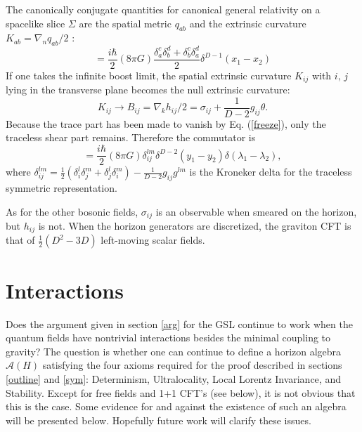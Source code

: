 \documentclass[12pt]{article}
\begin{document}
The canonically conjugate quantities for canonical general relativity on a spacelike slice $\Sigma$ are the spatial metric $q_{ab}$ and the extrinsic curvature
$K_{ab} = \nabla_{n} q_{ab}/2$ \cite{ADM}:
\begin{equation}
[q_{ab}(x_1),\,(K^{cd} - q^{cd} K)(x_2)] = \frac{i\hbar}{2} (8\pi G) \frac{\delta_a^c\delta_b^d + \delta_b^c\delta_a^d}{2} \delta^{D-1}(x_1 - x_2)
\end{equation}
If one takes the infinite boost limit, the spatial extrinsic curvature $K_{ij}$ with $i,\,j$ lying in the transverse plane becomes the null extrinsic curvature:
\begin{equation}
K_{ij} \to B_{ij} = \nabla_k h_{ij}/2 = \sigma_{ij} + \frac{1}{D-2} g_{ij} \theta.
\end{equation}
Because the trace part has been made to vanish by Eq. (\ref{freeze}), only the traceless shear part remains.  Therefore the commutator is
\begin{equation}
[h_{ij}(y_1,\,\lambda_1),\, \sigma^{lm}(y_2,\,\lambda_2)] = \frac{i\hbar}{2} (8 \pi G)
\delta_{ij}^{lm} \delta^{D-2}(y_1 - y_2) \delta(\lambda_1 - \lambda_2),
\end{equation}
where $\delta^{lm}_{ij} = \frac{1}{2}(\delta^l_i \delta^m_j + \delta^l_j \delta^m_i)
- \frac{1}{D-2} g_{ij}g^{lm}$ is the Kroneker delta for the traceless symmetric representation.

As for the other bosonic fields, $\sigma_{ij}$ is an observable when smeared on the horizon, but $h_{ij}$ is not.  When the horizon generators are discretized, the graviton CFT is that of $\frac{1}{2}(D^2 - 3D)$ left-moving scalar fields.

\section{Interactions}\label{int}

Does the argument given in section \ref{arg} for the GSL continue to work when the quantum fields have nontrivial interactions besides the minimal coupling to gravity?  The question is whether one can continue to define a horizon algebra $\mathcal{A}(H)$ satisfying the four axioms required for the proof described in sections \ref{outline} and \ref{sym}: Determinism, Ultralocality, Local Lorentz Invariance, and Stability.  Except for free fields and 1+1 CFT's (see below), it is not obvious that this is the case.  Some evidence for and against the existence of such an algebra will be presented below.  Hopefully future work will clarify these issues.
\end{document}
